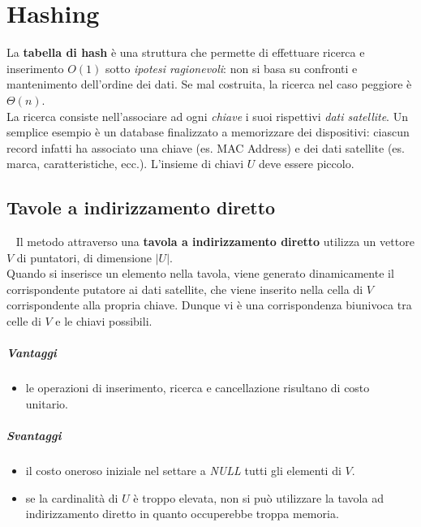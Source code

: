 \chapter{Hashing}
La \textbf{tabella di hash} è una struttura che permette di effettuare ricerca e inserimento $O(1)$ sotto \textit{ipotesi ragionevoli}: non si basa su confronti e mantenimento dell'ordine dei dati. Se mal costruita, la ricerca nel caso peggiore è $\varTheta(n)$.\\
La ricerca consiste nell'associare ad ogni \textit{chiave} i suoi rispettivi \textit{dati satellite}. Un semplice esempio è un database finalizzato a memorizzare dei dispositivi: ciascun record infatti ha associato una chiave (es. MAC Address) e dei dati satellite (es. marca, caratteristiche, ecc.). L'insieme di chiavi $U$ deve essere piccolo.

\section{Tavole a indirizzamento diretto}
~
Il metodo attraverso una \textbf{tavola a indirizzamento diretto} utilizza un vettore $V$ di puntatori, di dimensione $|U|$.\\
Quando si inserisce un elemento nella tavola, viene generato dinamicamente il corrispondente putatore ai dati satellite, che viene inserito nella cella di $V$ corrispondente alla propria chiave. Dunque vi è una corrispondenza biunivoca tra celle di $V$ e le chiavi possibili.

\paragraph{Vantaggi}
\begin{itemize}
	\item le operazioni di inserimento, ricerca e cancellazione risultano di costo unitario.
\end{itemize}
\paragraph{Svantaggi}
\begin{itemize}
	\item il costo oneroso iniziale nel settare a \textit{NULL} tutti gli elementi di $V$.
	\item se la cardinalità di $U$ è troppo elevata, non si può utilizzare la tavola ad indirizzamento diretto in quanto occuperebbe troppa memoria.
\end{itemize}

